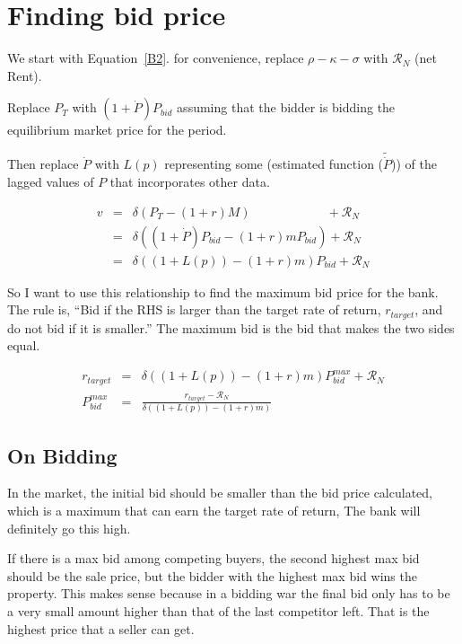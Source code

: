 \section{Finding bid price}
We start with Equation~\ref{B2}. for convenience, replace $\rho -\kappa - \sigma $ with $\mathcal{R}_N$ (net Rent). 

Replace $P_T$ with $(1+\dot P)P_{bid}$ assuming that the bidder is bidding the equilibrium market price for the period.

Then replace   $\dot P$ with $L(p)$ representing some (estimated function ($\tilde{\dot P}$)) of the lagged values of $P$ that incorporates other data. 

\begin{eqnarray}
v&=& \delta(P_T- (1+r)M) \qquad \qquad \qquad 	 + \mathcal{R}_N \nonumber\\
 &=&\delta\left( (1+\dot P)P_{bid} - (1+r)mP_{bid} \right)  + \mathcal{R}_N  \nonumber\\
  &=&\delta\left( (1+L(p)) - (1+r)m \right) P_{bid} + \mathcal{R}_N  \nonumber
\end{eqnarray}

So I want to use this relationship to find the maximum bid price for the bank. The rule is, ``Bid if the RHS is larger than the target rate of return, $r_{target}$, and do not bid if it is smaller.''  The maximum bid  is the bid that makes the two sides equal. 

{\color{red}
\begin{eqnarray}
r_{target}&=& \delta\left( (1+L(p)) - (1+r)m \right) P^{max}_{bid} + \mathcal{R}_N  \nonumber\\
   P^{max}_{bid} &=&\frac{r_{target}-\mathcal{R}_N}{\delta\left( (1+L(p)) - (1+r)m \right)} \label{EqBidPrice} 
\end{eqnarray}}
\newpage


\subsection{On Bidding}
In the market, the initial bid should be smaller than the bid price calculated, which is a maximum that can earn the target rate of return, The bank will definitely go this high. 

If there is a  max bid among competing buyers, the second highest max bid should be the sale price, but the bidder with the highest max bid wins the property. This makes sense because in a bidding war the final bid only has to be a very small amount higher than that of the last competitor left.
That is the highest price that a seller can get.

